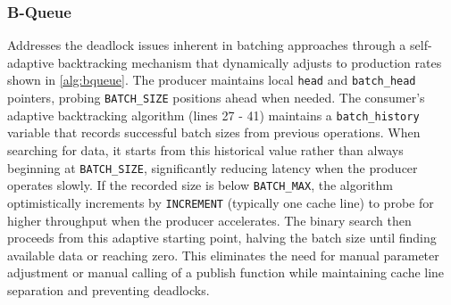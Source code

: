 \subsubsection{B-Queue}
Addresses the deadlock issues inherent in batching approaches through a self-adaptive backtracking mechanism that dynamically adjusts to production rates shown in \cref{alg:bqueue}. The producer maintains local \texttt{head} and \texttt{batch\_head} pointers, probing \texttt{BATCH\_SIZE} positions ahead when needed. The consumer's adaptive backtracking algorithm (lines 27 - 41) maintains a \texttt{batch\_history} variable that records successful batch sizes from previous operations. When searching for data, it starts from this historical value rather than always beginning at \texttt{BATCH\_SIZE}, significantly reducing latency when the producer operates slowly. If the recorded size is below \texttt{BATCH\_MAX}, the algorithm optimistically increments by \texttt{INCREMENT} (typically one cache line) to probe for higher throughput when the producer accelerates. The binary search then proceeds from this adaptive starting point, halving the batch size until finding available data or reaching zero. This eliminates the need for manual parameter adjustment or manual calling of a publish function while maintaining cache line separation and preventing deadlocks. \cite{Wang2013BQueue}

